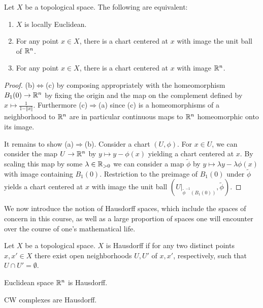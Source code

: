 \begin{proposition}\label{prop: locally euclidean and centered charts}
    Let $X$ be a topological space. The following are equivalent:
    \begin{enumerate}[label=(\alph*)]
        \item $X$ is locally Euclidean. 
        \item For any point $x\in X$, there is a chart centered at $x$ with image the unit ball of $\mathbb{R}^{n}$. 
        \item For any point $x\in X$, there is a chart centered at $x$ with image $\mathbb{R}^{n}$. 
    \end{enumerate}
\end{proposition}
\begin{proof}
    (b)$\Longleftrightarrow$(c) by composing appropriately with the homeomorphism $B_{1}(0)\to\mathbb{R}^{n}$ by fixing the origin and the map on the complement defined by $x\mapsto\frac{1}{1-\Vert x\Vert}$. Furthermore (c)$\Rightarrow$(a) since (c) is a homeomorphisms of a neighborhood to $\mathbb{R}^{n}$ are in particular continuous maps to $\mathbb{R}^{n}$ homeomorphic onto its image. 
    
    It remains to show (a)$\Rightarrow$(b). Consider a chart $(U,\phi)$. For $x\in U$, we can consider the map $U\to\mathbb{R}^{n}$ by $y\mapsto y-\phi(x)$ yielding a chart centered at $x$. By scaling this map by some $\lambda\in\mathbb{R}_{>0}$ we can consider a map $\widetilde{\phi}$ by $y\mapsto \lambda y-\lambda\phi(x)$ with image containing $B_{1}(0)$. Restriction to the preimage of $B_{1}(0)$ under $\widetilde{\phi}$ yields a chart centered at $x$ with image the unit ball $(U|_{\widetilde{\phi}^{-1}(B_{1}(0))}, \widetilde{\phi})$. 
\end{proof}
We now introduce the notion of Hausdorff spaces, which include the spaces of concern in this course, as well as a large proportion of spaces one will encounter over the course of one's mathematical life. 
\begin{definition}[Hausdorff]\label{def: Hausdorff}
    Let $X$ be a topological space. $X$ is Hausdorff if for any two distinct points $x,x'\in X$ there exist open neighborhoods $U,U'$ of $x,x'$, respectively, such that $U\cap U'=\emptyset$. 
\end{definition}
\begin{example}
    Euclidean space $\mathbb{R}^{n}$ is Hausdorff. 
\end{example}
\begin{example}
    CW complexes are Hausdorff. 
\end{example}
